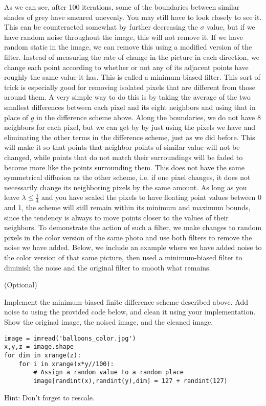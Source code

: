 As we can see, after 100 iterations, some of the boundaries between similar shades of grey have smeared unevenly. You may still have to look closely to see it.
This can be counteracted somewhat by further decreasing the $\sigma$ value, but if we have random noise throughout the image, this will not remove it.
If we have random static in the image, we can remove this using a modified version of the filter.
Instead of measuring the rate of change in the picture in each direction, we change each point according to whether or not any of its adjacent points have roughly the same value it has.
This is called a minimum-biased filter.
This sort of trick is especially good for removing isolated pixels that are different from those around them.
A very simple way to do this is by taking the average of the two smallest differences between each pixel and its eight neighbors and using that in place of $g$ in the difference scheme above.
Along the boundaries, we do not have 8 neighbors for each pixel, but we can get by by just using the pixels we have and eliminating the other terms in the difference scheme, just as we did before.
This will make it so that points that neighbor points of similar value will not be changed, while points that do not match their surroundings will be faded to become more like the points surrounding them.
This does not have the same symmetrical diffusion as the other scheme, i.e. if one pixel changes, it does not necessarily change its neighboring pixels by the same amount.
As long as you leave $\lambda \leq \frac{1}{4}$ and you have scaled the pixels to have floating point values between 0 and 1, the scheme will still remain within its minimum and maximum bounds, since the tendency is always to move points closer to the values of their neighbors.
To demonstrate the action of such a filter, we make changes to random pixels in the color version of the same photo and use both filters to remove the noise we have added.
Below, we include an example where we have added noise to the color version of that same picture, then used a minimum-biased filter to diminish the noise and the original filter to smooth what remains.

\begin{problem*}
(Optional)

Implement the minimum-biased finite difference scheme described above.
Add noise to  using the provided code below, and clean it using your implementation. 
Show the original image, the noised image, and the cleaned image.

\begin{lstlisting}
image = imread('balloons_color.jpg')
x,y,z = image.shape
for dim in xrange(z):
    for i in xrange(x*y//100):
        # Assign a random value to a random place
        image[randint(x),randint(y),dim] = 127 + randint(127)
\end{lstlisting}
Hint: Don't forget to rescale.

\end{problem*}

